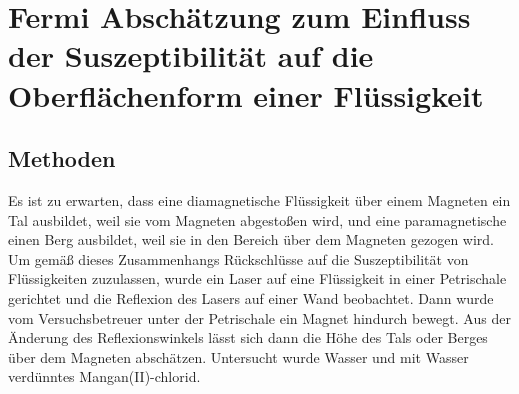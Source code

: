 \documentclass[
	a4paper,
	12pt,
	pagesize,
	ngerman
]{scrartcl}
\begin{document}
	\section{Fermi Abschätzung zum Einfluss der Suszeptibilität auf die Oberflächenform einer Flüssigkeit}
	\subsection{Methoden}
	Es ist zu erwarten, dass eine diamagnetische Flüssigkeit über einem Magneten ein Tal ausbildet, weil sie vom Magneten abgestoßen wird, und eine paramagnetische einen Berg ausbildet, weil sie in den Bereich über dem Magneten gezogen wird. %
	Um gemäß dieses Zusammenhangs Rückschlüsse auf die Suszeptibilität von Flüssigkeiten zuzulassen, wurde ein Laser auf eine Flüssigkeit in einer Petrischale gerichtet und die Reflexion des Lasers auf einer Wand beobachtet. Dann wurde vom Versuchsbetreuer unter der Petrischale ein Magnet hindurch bewegt. Aus der Änderung des Reflexionswinkels lässt sich dann die Höhe des Tals oder Berges über dem Magneten abschätzen. Untersucht wurde Wasser und mit Wasser verdünntes Mangan(II)-chlorid.
\end{document}
